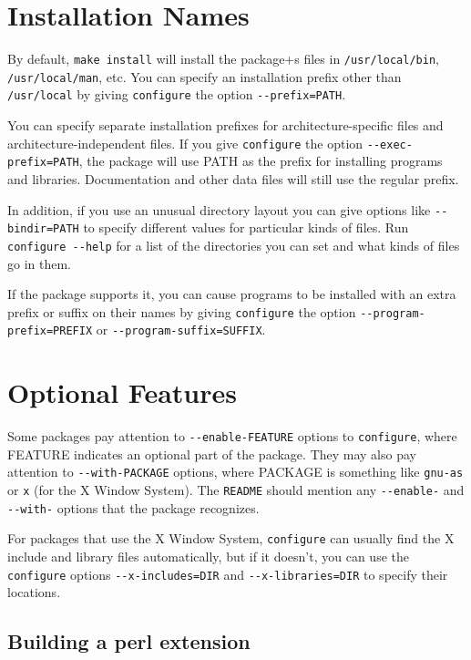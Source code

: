 \begin{appendix}
\section*{Installation Names}


   By default, \verb+make install+ will install the package+s files in
\verb+/usr/local/bin+, \verb+/usr/local/man+, etc.  You can specify an
installation prefix other than \verb+/usr/local+ by giving \verb+configure+ the
option \verb+--prefix=PATH+.

   You can specify separate installation prefixes for
architecture-specific files and architecture-independent files.  If you
give \verb+configure+ the option \verb+--exec-prefix=PATH+, the package will use
PATH as the prefix for installing programs and libraries.
Documentation and other data files will still use the regular prefix.

   In addition, if you use an unusual directory layout you can give
options like \verb+--bindir=PATH+ to specify different values for particular
kinds of files.  Run \verb+configure --help+ for a list of the directories
you can set and what kinds of files go in them.

   If the package supports it, you can cause programs to be installed
with an extra prefix or suffix on their names by giving \verb+configure+ the
option \verb+--program-prefix=PREFIX+ or \verb+--program-suffix=SUFFIX+.

\section*{Optional Features}


   Some packages pay attention to \verb+--enable-FEATURE+ options to
\verb+configure+, where FEATURE indicates an optional part of the package.
They may also pay attention to \verb+--with-PACKAGE+ options, where PACKAGE
is something like \verb+gnu-as+ or \verb+x+ (for the X Window System).  The
\verb+README+ should mention any \verb+--enable-+ and \verb+--with-+ options that the
package recognizes.

   For packages that use the X Window System, \verb+configure+ can usually
find the X include and library files automatically, but if it doesn't,
you can use the \verb+configure+ options \verb+--x-includes=DIR+ and
\verb+--x-libraries=DIR+ to specify their locations.


\subsection*{Building a perl extension}



\end{appendix}
